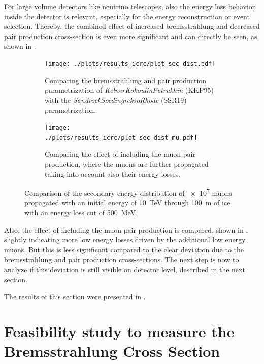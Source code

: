 For large volume detectors like neutrino telescopes, also the energy loss behavior inside the detector is relevant, especially for the energy reconstruction or event selection.
Thereby, the combined effect of increased bremsstrahlung and decreased pair production cross-section is even more significant and can directly be seen, as shown in .
\begin{figure}
    \centering
    \begin{subfigure}{0.47\textwidth}
        \centering
        \texttt{[image: ./plots/results\_icrc/plot\_sec\_dist.pdf]}
        \caption{Comparing the bremsstrahlung and pair production parametrization of \textit{KelnerKokoulinPetrukhin} (KKP95) with the \textit{SandrockSoedingreksoRhode} (SSR19) parametrization.}
        \label{fig:sec_dist_ssr_kkp}
    \end{subfigure}
    \hfill
    \begin{subfigure}{0.47\textwidth}
        \centering
        \texttt{[image: ./plots/results\_icrc/plot\_sec\_dist\_mu.pdf]}
        \caption{Comparing the effect of including the muon pair production, where the muons are further propagated taking into account also their energy losses.}
        \label{fig:sec_dist_mupair}
    \end{subfigure}
    \caption{Comparison of the secondary energy distribution of \num{e7} muons propagated with an initial energy of \SI{10}{TeV} through \SI{100}{m} of ice with an energy loss cut of \SI{500}{MeV}.}
    \label{fig:sec_dist_comapre}
\end{figure}

Also, the effect of including the muon pair production is compared, shown in , slightly indicating more low energy losses driven by the additional low energy muons.
But this is less significant compared to the clear deviation due to the bremsstrahlung and pair production cross-sections.
The next step is now to analyze if this deviation is still visible on detector level, described in the next section.

The results of this section were presented in \cite{Soedingrekso19ICRC}.

%

\section{Feasibility study to measure the Bremsstrahlung Cross Section} \label{sec:study}

